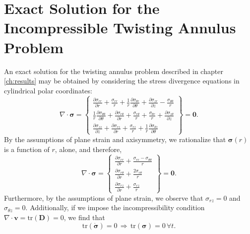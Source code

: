 \chapter{Exact Solution for the Incompressible Twisting Annulus Problem}

An exact solution for the twisting annulus problem described in chapter \ref{ch:results} may be obtained by considering the stress divergence equations in cylindrical polar coordinates:
\begin{equation}
  \nabla \cdot \boldsymbol{\sigma} = \left\{ \begin{array}{c} \frac{\partial \sigma_{rr}}{\partial r} + \frac{\sigma_{rr}}{r} + \frac{1}{r} \frac{\partial \sigma_{\theta r}}{\partial \theta} + \frac{\partial \sigma_{z r}}{\partial z} - \frac{\sigma_{\theta \theta}}{r} \\
    \frac{1}{r} \frac{\partial \sigma_{\theta \theta}}{\partial \theta} + \frac{\partial \sigma_{r\theta}}{\partial r} + \frac{\sigma_{r\theta}}{r} + \frac{\sigma_{\theta r}}{r} + \frac{\partial \sigma_{z \theta}}{\partial z} \\
    \frac{\partial \sigma_{z z}}{\partial z} + \frac{\partial \sigma_{r z}}{\partial r} + \frac{\sigma_{r z}}{r} + \frac{1}{r} \frac{\partial \sigma_{\theta z}}{\partial \theta} \end{array} \right\} = \mathbf{0}.
\end{equation}
By the assumptions of plane strain and axisymmetry, we rationalize that $\boldsymbol{\sigma} (r)$ is a function of $r$, alone, and therefore,
\begin{equation}
  \nabla \cdot \boldsymbol{\sigma} = \left\{ \begin{array}{c} \frac{\partial \sigma_{rr}}{\partial r} + \frac{\sigma_{rr} - \sigma_{\theta \theta}}{r} \\
    \frac{\partial \sigma_{r\theta}}{\partial r} + \frac{2 \sigma_{r\theta}}{r} \\
    \frac{\partial \sigma_{r z}}{\partial r} + \frac{\sigma_{r z}}{r} \end{array} \right\} = \mathbf{0}.
\end{equation}
Furthermore, by the assumptions of plane strain, we observe that $\sigma_{rz} = 0$ and $\sigma_{\theta z} = 0$. Additionally, if we impose the incompressibility condition $\nabla \cdot \mathbf{v} = \text{tr} (\mathbf{D}) = 0$, we find that
\begin{equation}
  \text{tr} (\dot{\boldsymbol{\sigma}}) = 0 \, \Rightarrow \, \text{tr} (\boldsymbol{\sigma}) = 0 \, \forall t.
\end{equation}
